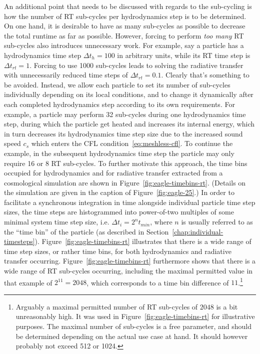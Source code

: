 An additional point that needs to be discussed with regards to the sub-cycling is how the number of
RT sub-cycles per hydrodynamics step is to be determined. On one hand, it is desirable to have as
many sub-cycles as possible to decrease the total runtime as far as possible. However, forcing
\GEARRT to perform \emph{too many} RT sub-cycles also introduces unnecessary work. For example, say
a particle has a hydrodynamics time step $\Delta t_h = 100$ in arbitrary units, while its RT time
step is $\Delta t_{rt} = 1$. Forcing \GEARRT to use 1000 sub-cycles leads to solving the radiative
transfer with unnecessarily reduced time steps of $\Delta t_{rt} = 0.1$. Clearly that's something
to be avoided. Instead, we allow each particle to set its number of sub-cycles individually
depending on its local conditions, and to change it dynamically after each completed hydrodynamics
step according to its own requirements. For example, a particle may perform 32 sub-cycles during one
hydrodynamics time step, during which the particle get heated and increases its internal energy,
which in turn decreases its hydrodynamics time step size due to the increased sound speed $c_s$
which enters the CFL condition~\ref{eq:meshless-cfl}. To continue the example, in the subsequent
hydrodynamics time step the particle may only require 16 or 8 RT sub-cycles. To further motivate
this approach, the time bins occupied for hydrodynamics and for radiative transfer extracted from a
cosmological simulation are shown in Figure~\ref{fig:eagle-timebins-rt}. (Details on the simulation
are given in the caption of Figure~\ref{fig:eagle-25}.) In order to facilitate a synchronous
integration in time alongside individual particle time step sizes, the time steps are histogrammed
into power-of-two multiples of some minimal system time step size, i.e. $\Delta t_i = 2^n t_{min}$,
where $n$ is usually referred to as the ``time bin'' of the particle (as described in
Section~\ref{chap:individual-timesteps}). Figure~\ref{fig:eagle-timebins-rt} illustrates that there
is a wide range of time step sizes, or rather time bins, for both hydrodynamics and radiative
transfer occurring. Figure~\ref{fig:eagle-timebins-rt} furthermore shows that there is a wide range of
RT sub-cycles occurring, including the maximal permitted value in that example of $2^{11} = 2048$,
which corresponds to a time bin difference of $11$.\footnote{
Arguably a maximal permitted number of RT sub-cycles of $2048$ is a bit unreasonably high. It was
used in Figure~\ref{fig:eagle-timebins-rt} for illustrative purposes. The maximal number of
sub-cycles is a free parameter, and should be determined depending on the actual use case at hand.
It should however probably not exceed 512 or 1024.
}
